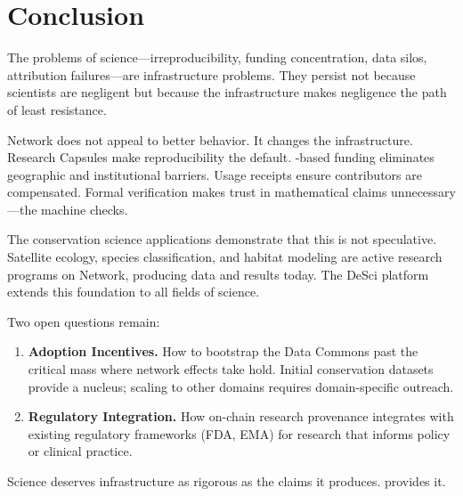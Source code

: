 \section{Conclusion}

\label{sec:conclusion}

The problems of science---irreproducibility, funding concentration, data silos, attribution failures---are infrastructure problems. They persist not because scientists are negligent but because the infrastructure makes negligence the path of least resistance.

\Zoo{} Network does not appeal to better behavior. It changes the infrastructure. Research Capsules make reproducibility the default. \ZIP{}-based funding eliminates geographic and institutional barriers. Usage receipts ensure contributors are compensated. Formal verification makes trust in mathematical claims unnecessary---the machine checks.

The conservation science applications demonstrate that this is not speculative. Satellite ecology, species classification, and habitat modeling are active research programs on \Zoo{} Network, producing data and results today. The DeSci platform extends this foundation to all fields of science.

Two open questions remain:

\begin{enumerate}
    \item \textbf{Adoption Incentives.} How to bootstrap the Data Commons past the critical mass where network effects take hold. Initial conservation datasets provide a nucleus; scaling to other domains requires domain-specific outreach.
    \item \textbf{Regulatory Integration.} How on-chain research provenance integrates with existing regulatory frameworks (FDA, EMA) for research that informs policy or clinical practice.
\end{enumerate}

Science deserves infrastructure as rigorous as the claims it produces. \Zoo{} provides it.

